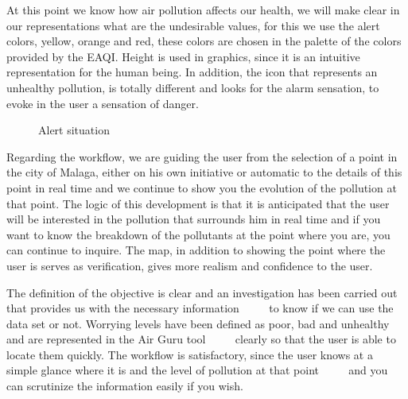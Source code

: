 At this point we know how air pollution affects our health, we will make clear in our representations what are the undesirable values,
for this we use the alert colors, yellow, orange and red, these colors are chosen in the palette of the colors provided by the EAQI.
Height is used in graphics, since it is an intuitive representation for the human being. In addition, the icon that represents an unhealthy pollution, is
totally different and looks for the alarm sensation, to evoke in the user a sensation of danger. \\
\newpage
\begin{figure}[ht]
    \centering
    \hfill
  
  \caption{Alert situation}
    \end{figure}

    Regarding the workflow, we are guiding the user from the selection of a point in the city of Malaga, either on his own initiative
    or automatic to the details of this point in real time and we continue to show you the evolution of the pollution at that point.
    The logic of this development is that it is anticipated that the user will be interested in the pollution that surrounds him in real time and if
    you want to know the breakdown of the pollutants at the point where you are, you can continue to inquire. The map, in addition to showing
    the point where the user is serves as verification, gives more realism and confidence to the user.

\begin{itemize}
    \done The definition of the objective is clear and an investigation has been carried out that provides us with the necessary information
         to know if we can use the data set or not.
    \done Worrying levels have been defined as poor, bad and unhealthy and are represented in the Air Guru tool
         clearly so that the user is able to locate them quickly.
     \done The workflow is satisfactory, since the user knows at a simple glance where it is and the level of pollution at that point
         and you can scrutinize the information easily if you wish.
    
\end{itemize}
 

\newpage